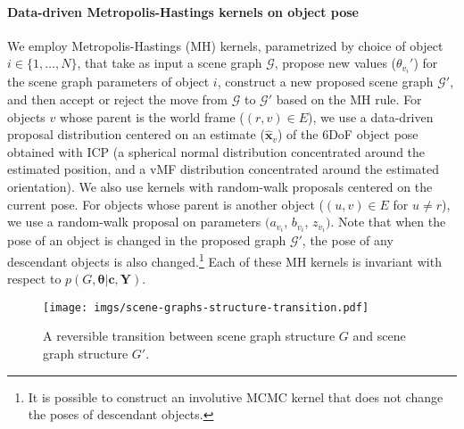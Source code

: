\paragraph{Data-driven Metropolis-Hastings kernels on object pose}
We employ Metropolis-Hastings (MH) kernels, parametrized by choice of object $i \in \{1, \ldots, N\}$, that
take as input a scene graph $\mathcal{G}$,
propose new values ($\theta_{v_i}'$) for the scene graph parameters of object $i$,
construct a new proposed scene graph $\mathcal{G'}$,
and then accept or reject the move from $\mathcal{G}$ to $\mathcal{G'}$ based on 
the MH rule.
For objects $v$ whose parent is the world frame ($(r, v) \in E$), we use a data-driven proposal distribution centered on an estimate ($\hat{\mathbf{x}}_v$) of the 6DoF object pose obtained with ICP 
(a spherical normal distribution concentrated around the estimated position,
and a vMF distribution concentrated around the estimated orientation).
We also use kernels with random-walk proposals centered on the current pose.
For objects whose parent is another object ($(u, v) \in E$ for $u \ne r$),
we use a random-walk proposal on parameters $(a_{v_i}$, $b_{v_i}$, $z_{v_i})$.
Note that when the pose of an object is changed in the proposed graph $\mathcal{G'}$,
the pose of any descendant objects is also changed.\footnote{%
It is possible to construct an involutive MCMC kernel that does not change the poses of descendant objects.}
Each of these MH kernels is invariant with respect to $p(G, \bm\theta | \mathbf{c}, \mathbf{Y})$.

\begin{figure}[t]
	\centering
	\texttt{[image: imgs/scene-graphs-structure-transition.pdf]}
	\caption{A reversible transition between scene graph structure $G$ and scene graph structure $G'$.}
	\label{fig:scene-graph-structure-change}
\end{figure}


